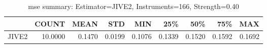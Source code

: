 \begin{table}[ht]
\centering
\caption{mse summary: Estimator=JIVE2, Instruments=166, Strength=0.40}
\begin{tabular}{lrrrrrrrr}
\toprule
 & COUNT & MEAN & STD & MIN & 25\% & 50\% & 75\% & MAX \\
\midrule
JIVE2 & 10.0000 & 0.1470 & 0.0199 & 0.1076 & 0.1339 & 0.1520 & 0.1592 & 0.1692 \\
\bottomrule
\end{tabular}
\end{table}
